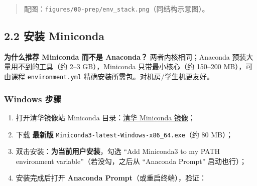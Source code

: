 \begin{Shaded}
\begin{Highlighting}[]
\NormalTok{+{-}{-}{-}{-}{-}{-}{-}{-}{-}{-}{-}{-}{-}{-}{-}{-}{-}{-}{-}{-}{-}{-}{-}{-}{-}{-}{-}{-}{-}+}
\NormalTok{+{-}{-}{-}{-}{-}{-}{-}{-}{-}{-}{-}{-}{-}{-}{-}{-}{-}{-}{-}{-}{-}{-}{-}{-}{-}{-}{-}{-}{-}+}
\NormalTok{+{-}{-}{-}{-}{-}{-}{-}{-}{-}{-}{-}{-}{-}{-}{-}{-}{-}{-}{-}{-}{-}{-}{-}{-}{-}{-}{-}{-}{-}+}
\NormalTok{+{-}{-}{-}{-}{-}{-}{-}{-}{-}{-}{-}{-}{-}{-}{-}{-}{-}{-}{-}{-}{-}{-}{-}{-}{-}{-}{-}{-}{-}+}
\NormalTok{+{-}{-}{-}{-}{-}{-}{-}{-}{-}{-}{-}{-}{-}{-}{-}{-}{-}{-}{-}{-}{-}{-}{-}{-}{-}{-}{-}{-}{-}+}
\NormalTok{+{-}{-}{-}{-}{-}{-}{-}{-}{-}{-}{-}{-}{-}{-}{-}{-}{-}{-}{-}{-}{-}{-}{-}{-}{-}{-}{-}{-}{-}+}
\end{Highlighting}
\end{Shaded}

\begin{quote}
配图：\texttt{figures/00-prep/env\_stack.png}（同结构示意图）。
\end{quote}

\subsection{2.2 安装 Miniconda}\label{ux5b89ux88c5-miniconda}

\textbf{为什么推荐 Miniconda 而不是 Anaconda？} 两者内核相同；Anaconda
预装大量用不到的工具（约 2--3 GB），Miniconda 只带最小核心（约 150--200
MB），可由课程 \texttt{environment.yml}
精确安装所需包。对机房/学生机更友好。

\subsubsection{Windows 步骤}\label{windows-ux6b65ux9aa4}

\begin{enumerate}
\def\labelenumi{\arabic{enumi}.}
\tightlist
\item
  打开清华镜像站 Miniconda
  目录：\href{https://mirrors.tuna.tsinghua.edu.cn/anaconda/miniconda/}{清华
  Miniconda 镜像}；
\item
  下载 \textbf{最新版}
  \texttt{Miniconda3-latest-Windows-x86\_64.exe}（约 80 MB）；
\item
  双击安装：\textbf{为当前用户安装}，勾选 ``Add Miniconda3 to my PATH
  environment variable''（若没勾，之后从 ``Anaconda Prompt''
  启动也行）；
\item
  安装完成后打开 \textbf{Anaconda Prompt}（或重启终端），验证：
\end{enumerate}

